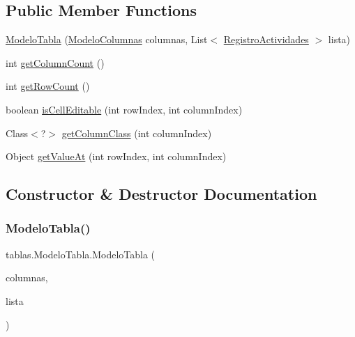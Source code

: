 \subsection*{Public Member Functions}
\begin{DoxyCompactItemize}
\item 
\mbox{\hyperlink{classtablas_1_1_modelo_tabla_a07edb22f783629dc40b2dee9cd94a393}{Modelo\+Tabla}} (\mbox{\hyperlink{classtablas_1_1_modelo_columnas}{Modelo\+Columnas}} columnas, List$<$ \mbox{\hyperlink{classclases_1_1_registro_actividades}{Registro\+Actividades}} $>$ lista)
\item 
int \mbox{\hyperlink{classtablas_1_1_modelo_tabla_a1faac3ee77c6bc28f9692b249b139777}{get\+Column\+Count}} ()
\item 
int \mbox{\hyperlink{classtablas_1_1_modelo_tabla_a33b1d4d7417e8a029de119325e63b081}{get\+Row\+Count}} ()
\item 
boolean \mbox{\hyperlink{classtablas_1_1_modelo_tabla_add22b2987d0ff8b8b517c11a6aa72fe2}{is\+Cell\+Editable}} (int row\+Index, int column\+Index)
\item 
Class$<$?$>$ \mbox{\hyperlink{classtablas_1_1_modelo_tabla_a55d3ab6069455d5f459118bb658c24b2}{get\+Column\+Class}} (int column\+Index)
\item 
Object \mbox{\hyperlink{classtablas_1_1_modelo_tabla_a4b26a3776637f75bac9ba3d5c06d7640}{get\+Value\+At}} (int row\+Index, int column\+Index)
\end{DoxyCompactItemize}


\subsection{Constructor \& Destructor Documentation}
\mbox{\label{classtablas_1_1_modelo_tabla_a07edb22f783629dc40b2dee9cd94a393}} 
\subsubsection{\texorpdfstring{Modelo\+Tabla()}{ModeloTabla()}}
{\footnotesize\ttfamily tablas.\+Modelo\+Tabla.\+Modelo\+Tabla (\begin{DoxyParamCaption}\item[{\mbox{\hyperlink{classtablas_1_1_modelo_columnas}{Modelo\+Columnas}}}]{columnas,  }\item[{List$<$ \mbox{\hyperlink{classclases_1_1_registro_actividades}{Registro\+Actividades}} $>$}]{lista }\end{DoxyParamCaption})}



